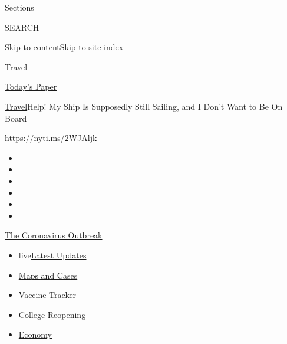 Sections

SEARCH

\protect\hyperlink{site-content}{Skip to
content}\protect\hyperlink{site-index}{Skip to site index}

\href{https://www.nytimes3xbfgragh.onion/section/travel}{Travel}

\href{https://myaccount.nytimes3xbfgragh.onion/auth/login?response_type=cookie\&client_id=vi}{}

\href{https://www.nytimes3xbfgragh.onion/section/todayspaper}{Today's
Paper}

\href{/section/travel}{Travel}\textbar{}Help! My Ship Is Supposedly
Still Sailing, and I Don't Want to Be On Board

\url{https://nyti.ms/2WJAljk}

\begin{itemize}
\item
\item
\item
\item
\item
\item
\end{itemize}

\href{https://www.nytimes3xbfgragh.onion/news-event/coronavirus?action=click\&pgtype=Article\&state=default\&region=TOP_BANNER\&context=storylines_menu}{The
Coronavirus Outbreak}

\begin{itemize}
\tightlist
\item
  live\href{https://www.nytimes3xbfgragh.onion/2020/08/04/world/coronavirus-cases.html?action=click\&pgtype=Article\&state=default\&region=TOP_BANNER\&context=storylines_menu}{Latest
  Updates}
\item
  \href{https://www.nytimes3xbfgragh.onion/interactive/2020/us/coronavirus-us-cases.html?action=click\&pgtype=Article\&state=default\&region=TOP_BANNER\&context=storylines_menu}{Maps
  and Cases}
\item
  \href{https://www.nytimes3xbfgragh.onion/interactive/2020/science/coronavirus-vaccine-tracker.html?action=click\&pgtype=Article\&state=default\&region=TOP_BANNER\&context=storylines_menu}{Vaccine
  Tracker}
\item
  \href{https://www.nytimes3xbfgragh.onion/2020/08/02/us/covid-college-reopening.html?action=click\&pgtype=Article\&state=default\&region=TOP_BANNER\&context=storylines_menu}{College
  Reopening}
\item
  \href{https://www.nytimes3xbfgragh.onion/live/2020/08/04/business/stock-market-today-coronavirus?action=click\&pgtype=Article\&state=default\&region=TOP_BANNER\&context=storylines_menu}{Economy}
\end{itemize}

